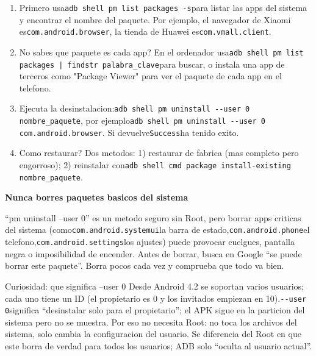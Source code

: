 \begin{enumerate}
  \item Primero usa\texttt{adb shell pm list packages -\allowbreak s}para listar las apps del sistema y encontrar el nombre del paquete. Por ejemplo, el navegador de Xiaomi es\texttt{com.\allowbreak android.\allowbreak browser}, la tienda de Huawei es\texttt{com.\allowbreak vmall.\allowbreak client}.
  \item No sabes que paquete es cada app? En el ordenador usa\texttt{adb shell pm list packages | findstr palabra\_clave}para buscar, o instala una app de terceros como "Package Viewer" para ver el paquete de cada app en el telefono.
  \item Ejecuta la desinstalacion:\texttt{adb shell pm uninstall -\allowbreak -\allowbreak user 0 nombre\_paquete}, por ejemplo\texttt{adb shell pm uninstall -\allowbreak -\allowbreak user 0 com.\allowbreak android.\allowbreak browser}. Si devuelve\texttt{Success}ha tenido exito.
  \item Como restaurar? Dos metodos: 1) restaurar de fabrica (mas completo pero engorroso); 2) reinstalar con\texttt{adb shell cmd package install-\allowbreak existing nombre\_paquete}.
\end{enumerate}

\textbf{Nunca borres paquetes basicos del sistema}\par

“pm uninstall --user 0” es un metodo seguro sin Root, pero borrar apps criticas del sistema (como\texttt{com.\allowbreak android.\allowbreak systemui}la barra de estado,\texttt{com.\allowbreak android.\allowbreak phone}el telefono,\texttt{com.\allowbreak android.\allowbreak settings}los ajustes) puede provocar cuelgues, pantalla negra o imposibilidad de encender. Antes de borrar, busca en Google “se puede borrar este paquete”. Borra pocos cada vez y comprueba que todo va bien.

\begin{tcbinfo}{Curiosidad: que significa --user 0}
Desde Android 4.2 se soportan varios usuarios; cada uno tiene un ID (el propietario es 0 y los invitados empiezan en 10).\texttt{-\allowbreak -\allowbreak user 0}significa “desinstalar solo para el propietario”; el APK sigue en la particion del sistema pero no se muestra. Por eso no necesita Root: no toca los archivos del sistema, solo cambia la configuracion del usuario. Se diferencia del Root en que este borra de verdad para todos los usuarios; ADB solo “oculta al usuario actual”.

\end{tcbinfo}

